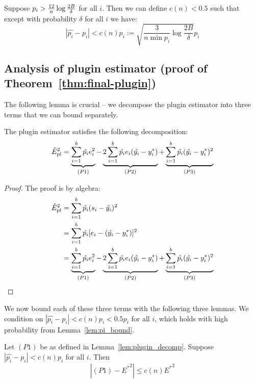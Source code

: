 \begin{lemma}
\label{lem:pi_bound}
Suppose $p_i > \frac{12}{n}\log{\frac{2B}{\delta}}{}$ for all $i$. Then we can define $c(n) < 0.5$ such that except with probability $\delta$ for all $i$ we have:
\[ |\hat{p_i} - p_i| < c(n)p_i := \sqrt{\frac{3}{n \min p_i} \log{\frac{2B}{\delta}}} p_i \]
\end{lemma}

\subsection{Analysis of plugin estimator (proof of Theorem~\ref{thm:final-plugin})}

The following lemma is crucial -- we decompose the plugin estimator into three terms that we can bound separately.

\begin{lemma}
\label{lem:plugin_decomp}
The plugin estimator satisfies the following decomposition:
\[ \hat{E}_{\textup{pl}}^2{} = \underbrace{\sum_{i=1}^b \hat{p_i}e_i^2}_{(P1)}  - \underbrace{2\sum_{i=1}^b \hat{p_i}e_i(\hat{y_i} - y_i^*)}_{(P2)} + \underbrace{\sum_{i=1}^b \hat{p_i}(\hat{y_i} - y_i^*)^2}_{(P3)} \]
\end{lemma}

\begin{proof}
The proof is by algebra:
\begin{align*}
\hat{E}_{\textup{pl}}^2{} &= \sum_{i=1}^b \hat{p_i}(s_i - \hat{y_i})^2 \\
&= \sum_{i=1}^b \hat{p_i}[e_i - (\hat{y_i} - y_i^*)]^2 \\
&= \underbrace{\sum_{i=1}^b \hat{p_i}e_i^2}_{(P1)}  - \underbrace{2\sum_{i=1}^b \hat{p_i}e_i(\hat{y_i} - y_i^*)}_{(P2)} + \underbrace{\sum_{i=1}^b \hat{p_i}(\hat{y_i} - y_i^*)^2}_{(P3)}
\end{align*}
\end{proof}

We now bound each of these three terms with the following three lemmas. We condition on $|\hat{p_i} - p_i| < c(n)p_i < 0.5p_i$ for all $i$, which holds with high probability from Lemma~\ref{lem:pi_bound}.

\begin{lemma}
\label{lem:p1_bound}
Let $(P1)$ be as defined in Lemma~\ref{lem:plugin_decomp}.
Suppose $|\hat{p_i} - p_i| < c(n) p_i$ for all $i$. Then
\[ |(P1) - {E^*}^2| \leq c(n) {E^*}^2 \]
\end{lemma}

